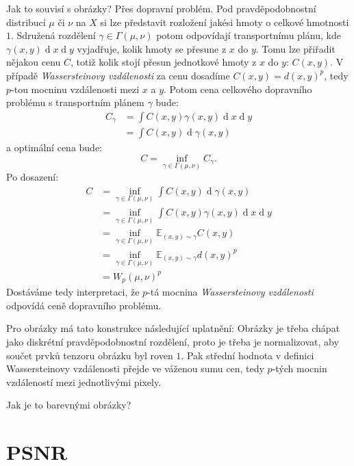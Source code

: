\documentclass[czech]{article}
\begin{document}
Jak to souvisí s obrázky?
Přes dopravní problém.
Pod pravděpodobnostní distribucí $\mu$ či $\nu$ na $X$ si lze představit rozložení jakési hmoty
o celkové hmotnosti $1$.
Sdružená rozdělení $\gamma \in \Gamma(\mu, \nu)$ potom odpovídají transportnímu plánu,
kde $\gamma(x, y) \operatorname{d}x \operatorname{d}y$
vyjadřuje, kolik hmoty se přesune z $x$ do $y$.
Tomu lze přiřadit nějakou cenu $C$,
totiž kolik stojí přesun jednotkové hmoty z $x$ do $y$: $C(x, y)$.
V případě \emph{Wassersteinovy vzdálenosti}
za cenu dosadíme $C(x, y) = d(x, y)^p$,
tedy $p$-tou mocninu vzdálenosti mezi $x$ a $y$.
Potom cena celkového dopravního problému s transportním plánem $\gamma$ bude:
\begin{align}
    C_\gamma &= \int C(x, y) \gamma(x, y) \operatorname{d}x \operatorname{d}y \\
    &= \int C(x, y) \operatorname{d} \gamma(x, y)
\end{align}
a optimální cena bude:
\begin{equation}
    C = \inf_{\gamma \in \Gamma(\mu, \nu)} C_\gamma.
\end{equation}
Po dosazení:
\begin{align}
    C &= \inf_{\gamma \in \Gamma(\mu, \nu)} \int C(x, y) \operatorname{d} \gamma(x, y) \\
    &= \inf_{\gamma \in \Gamma(\mu, \nu)} \int C(x, y) \gamma(x, y) \operatorname{d}x \operatorname{d}y \\
    &= \inf_{\gamma \in \Gamma(\mu, \nu)} \mathbb{E}_{(x, y) \sim \gamma} C(x, y) \\
    &= \inf_{\gamma \in \Gamma(\mu, \nu)} \mathbb{E}_{(x, y) \sim \gamma} d(x, y)^p \\
    &= W_p (\mu, \nu)^p
\end{align}
Dostáváme tedy interpretaci, že $p$-tá mocnina \emph{Wassersteinovy vzdálenosti}
odpovídá ceně dopravního problému.

Pro obrázky má tato konstrukce následující uplatnění:
Obrázky je třeba chápat jako diskrétní pravděpodobnostní rozdělení,
proto je třeba je normalizovat,
aby součet prvků tenzoru obrázku byl roven $1$.
Pak střední hodnota v definici Wassersteinovy vzdálenosti přejde ve váženou sumu cen,
tedy $p$-tých mocnin vzdáleností mezi jednotlivými pixely.

Jak je to barevnými obrázky?

\section{PSNR}
\end{document}
